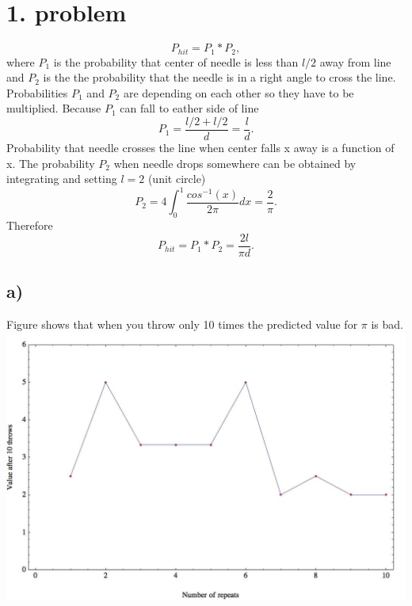 \documentclass[12pt]{article}
\numberwithin{equation}{section}
\numberwithin{table}{section}
\begin{document}
\maketitle

\newpage{}


\section*{1. problem}

\begin{equation*}
P_{hit}=P_1*P_2,
\end{equation*}
where $P_1$ is the probability that center of needle is less than $l/2$ away from line and $P_2$ is the the probability that the needle is in a right angle to cross the line. Probabilities $P_1$ and $P_2$ are depending on each other so they have to be multiplied. Because $P_1$ can fall to eather side of line 
\begin{equation*}
P_1=\frac{l/2+l/2}{d}=\frac{l}{d}.
\end{equation*}
Probability that needle crosses the line when center falls x away is a function of x. The probability $P_2$ when needle drops somewhere can be obtained by integrating and setting $l=2$ (unit circle)
\begin{equation*}
P_2=4\int_{0}^{1}\frac{cos^{-1}(x)}{2\pi}dx=\frac{2}{\pi}.
\end{equation*}
Therefore
\begin{equation*}
P_{hit}=P_1*P_2=\frac{2l}{\pi d}.
\end{equation*}
\subsection*{a)}Figure shows that when you throw only 10 times the predicted value for $\pi$ is bad.
\includegraphics[width=15cm]{mc_p01_a.jpg}
\end{document}
